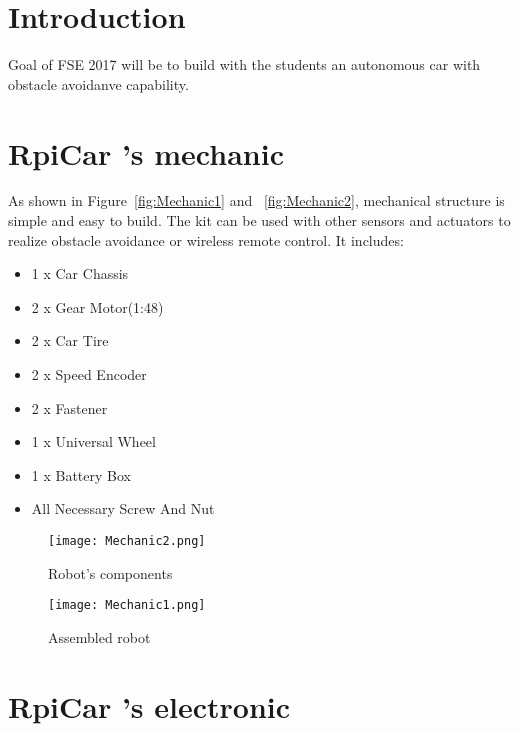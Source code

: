 \documentclass[
12pt, %
a4paper, %
oneside, %
headinclude,footinclude, %
BCOR5mm, %
]{scrartcl}
\begin{document}
%
\newpage
%


\section{Introduction}
Goal of FSE 2017 will be to build with the students an autonomous car with obstacle avoidanve capability.


\section{RpiCar 's mechanic}
As shown in Figure~\vref{fig:Mechanic1} and ~\vref{fig:Mechanic2}, mechanical structure is simple and easy to build. The kit can be used with other sensors and actuators to realize obstacle avoidance or wireless remote control. It includes:
\begin{itemize}
\item 1 x Car Chassis 
\item 2 x Gear Motor(1:48) 
\item 2 x Car Tire 
\item 2 x Speed Encoder 
\item 2 x Fastener 
\item 1 x Universal Wheel 
\item 1 x Battery Box 
\item All Necessary Screw And Nut
\end{itemize}

\begin{figure}[!htb]
  \texttt{[image: Mechanic2.png]}
  \caption{Robot's components}\label{fig:Mechanic2}
\endminipage\hfill
{}
  \texttt{[image: Mechanic1.png]}
  \caption{Assembled robot}\label{fig:Mechanic1}
\endminipage
\end{figure}


\section{RpiCar 's electronic}
\end{document}
